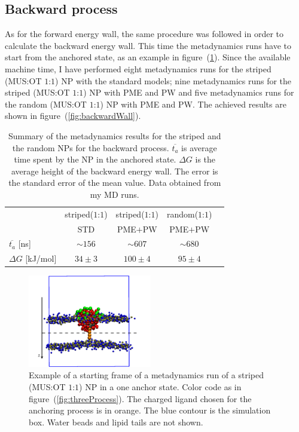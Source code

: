 \subsection{Backward process}
As for the forward energy wall, the same procedure was followed in order to calculate the backward energy wall. This time the metadynamics runs have to start from the anchored state, as an example in figure~(\ref{fig:startFrameAnchored}). Since the available machine time, I have performed eight metadynamics runs for the striped (\ac{MUS}:\ac{OT} $1$:$1$) \ac{NP} with the standard \martini models; nine metadynamics runs for the striped (\ac{MUS}:\ac{OT} $1$:$1$) \ac{NP} with \ac{PME} and \ac{PW} and five metadynamics runs for the random (\ac{MUS}:\ac{OT} $1$:$1$) \ac{NP} with \ac{PME} and \ac{PW}. The achieved results are shown in figure~(\ref{fig:backwardWall}).
\begin{table}[h!t]
	\centering
	\begin{tabular}{lcccc}
		\toprule
		\,					& striped($1$:$1$)	& striped($1$:$1$)	& random($1$:$1$)	\\
		\,					& STD & \acs{PME}$+$\acs{PW} & \acs{PME}$+$\acs{PW} \\ \toprule
	$\overline{t_{a}}$ [ns]	& $\sim 156$	& $\sim 607$	& $\sim 680$	\\ \midrule
	$\Delta G$ [kJ/mol] 	& $34 \pm 3$ 	& $100 \pm 4$ 	& $95 \pm 4$	\\ \bottomrule
	\end{tabular}
	\caption{Summary of the metadynamics results for the striped and the random \acp{NP} for the backward process. $\overline{t_a}$ is average time spent by the \acs{NP} in the anchored state. $\Delta G$ is the average height of the backward energy wall. The error is the standard error of the mean value. Data obtained from my \acs{MD} runs.}%
	\label{tab:anchorTime}
\end{table}

\begin{figure}
	\centering
	\includegraphics[width=0.48\textwidth]{./img/patchedAnchored}
	\caption{Example of a starting frame of a metadynamics run of a striped (\ac{MUS}:\ac{OT} $1$:$1$) \ac{NP} in a one anchor state. Color code as in figure~(\ref{fig:threeProcess}). The charged ligand chosen for the anchoring process is in orange. The blue contour is the simulation box. Water beads and lipid tails are not shown.}%
	\label{fig:startFrameAnchored}
\end{figure}

